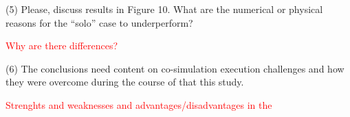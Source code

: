 \documentclass[answers,12pt]{exam}
\begin{document}
\begin{questions}
\question 
(5) Please, discuss results in Figure 10. What are the numerical or physical reasons for the “solo” case to underperform? 
\begin{solution}
\textcolor{red}{Why are there differences?}

\end{solution}

\question 
(6) The conclusions need content on co-simulation execution challenges and how they were overcome during the course of that this study.
\begin{solution}
\textcolor{red}{Strenghts and weaknesses and advantages/disadvantages in the}

\end{solution}
\end{questions}
\end{document}
